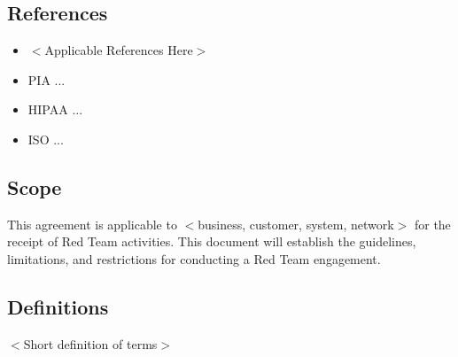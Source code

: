 \documentclass[12pt,letterpaper]{article}
\begin{document}
\subsection{References}
\begin{itemize}
    \item $<$Applicable References Here$>$
    \item PIA ...
    \item HIPAA ...
    \item ISO ...
\end{itemize}

\subsection{Scope}
This agreement is applicable to $<$business, customer, system, network$>$ for the receipt of Red Team activities. This document will establish the guidelines, limitations, and restrictions for conducting a Red Team engagement.

\subsection{Definitions}
$<$Short definition of terms$>$
\end{document}
